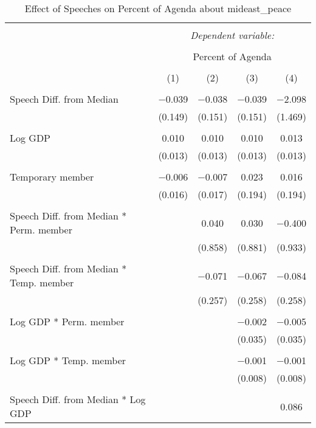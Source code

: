 
\begin{table}[!htbp] \centering 
  \caption{Effect of Speeches on Percent of Agenda about mideast_peace} 
  \label{} 
\begin{tabular}{@{\extracolsep{5pt}}lcccc} 
\\[-1.8ex]\hline 
\hline \\[-1.8ex] 
 & \multicolumn{4}{c}{\textit{Dependent variable:}} \\ 
\cline{2-5} 
\\[-1.8ex] & \multicolumn{4}{c}{Percent of Agenda} \\ 
\\[-1.8ex] & (1) & (2) & (3) & (4)\\ 
\hline \\[-1.8ex] 
 Speech Diff. from Median & $-$0.039 & $-$0.038 & $-$0.039 & $-$2.098 \\ 
  & (0.149) & (0.151) & (0.151) & (1.469) \\ 
  & & & & \\ 
 Log GDP & 0.010 & 0.010 & 0.010 & 0.013 \\ 
  & (0.013) & (0.013) & (0.013) & (0.013) \\ 
  & & & & \\ 
 Temporary member & $-$0.006 & $-$0.007 & 0.023 & 0.016 \\ 
  & (0.016) & (0.017) & (0.194) & (0.194) \\ 
  & & & & \\ 
 Speech Diff. from Median * Perm. member &  & 0.040 & 0.030 & $-$0.400 \\ 
  &  & (0.858) & (0.881) & (0.933) \\ 
  & & & & \\ 
 Speech Diff. from Median * Temp. member &  & $-$0.071 & $-$0.067 & $-$0.084 \\ 
  &  & (0.257) & (0.258) & (0.258) \\ 
  & & & & \\ 
 Log GDP * Perm. member &  &  & $-$0.002 & $-$0.005 \\ 
  &  &  & (0.035) & (0.035) \\ 
  & & & & \\ 
 Log GDP * Temp. member &  &  & $-$0.001 & $-$0.001 \\ 
  &  &  & (0.008) & (0.008) \\ 
  & & & & \\ 
 Speech Diff. from Median * Log GDP &  &  &  & 0.086 \\ 

\end{tabular}
\end{table}
